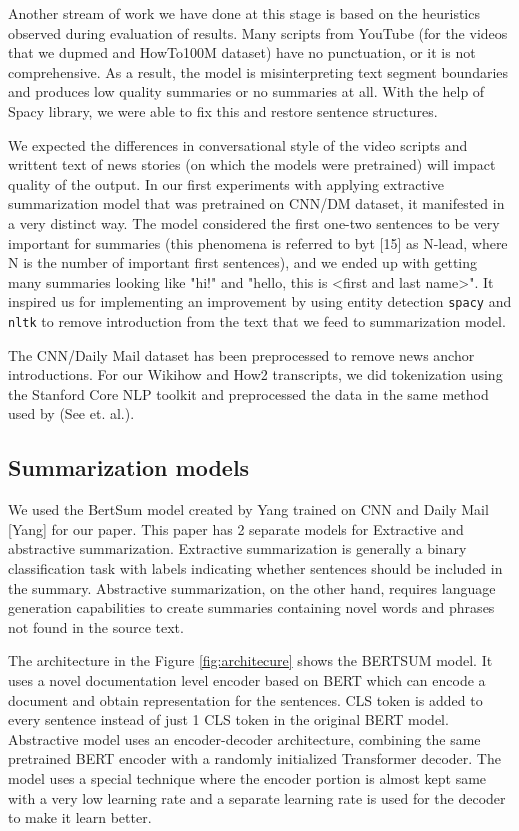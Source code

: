 \documentclass{article}
\begin{document}
Another stream of work we have done at this stage is based on the heuristics observed during evaluation of results. Many scripts from YouTube (for the videos that we dupmed and HowTo100M dataset) have no punctuation, or it is not comprehensive. As a result, the model is misinterpreting text segment boundaries and produces low quality summaries or no summaries at all. With the help of Spacy library, we were able to fix this and restore sentence structures. 

We expected the differences in conversational style of the video scripts and writtent text of news stories (on which the models were pretrained) will impact quality of the output. In our first experiments with applying extractive summarization model that was pretrained on CNN/DM dataset, it manifested in a very distinct way. The model considered the first one-two sentences to be very important for summaries (this phenomena is referred to byt [15] as N-lead, where N is the number of important first sentences), and we ended up with getting many summaries looking like "hi!" and "hello, this is <first and last name>". It inspired us for implementing an improvement by using entity detection   \verb+spacy+ and \verb+nltk+ to remove introduction from the text that we feed to summarization model.  

The CNN/Daily Mail dataset has been preprocessed to remove news anchor introductions. For our Wikihow and How2 transcripts, we  did tokenization using the Stanford Core NLP toolkit and preprocessed the data in the same method used by (See et. al.).  


\subsection{Summarization models}

We used the BertSum model created by Yang trained on CNN and Daily Mail [Yang]  for our paper. This paper has 2 separate models for Extractive and abstractive summarization. Extractive summarization is generally a binary classification task with labels indicating whether sentences should be included in the summary. Abstractive summarization, on the other hand, requires language generation capabilities to create summaries containing novel words and phrases not found in the source text. 

The architecture in the Figure \ref{fig:architecure} shows the BERTSUM model. It uses a novel documentation level encoder based on BERT which can encode a document and obtain representation for the sentences. CLS token is added to every sentence instead of just 1 CLS token in the original BERT model. Abstractive model uses an encoder-decoder architecture, combining the same pretrained BERT encoder with a randomly initialized Transformer decoder. The model uses a special technique where the encoder portion is almost kept same with a very low learning rate and a separate learning rate is used for the decoder to make it learn better. 
\end{document}
